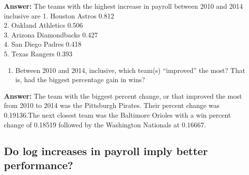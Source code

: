 \documentclass[
]{article}
\newenvironment{Shaded}{\begin{snugshade}}{\end{snugshade}}
\newcommand{\AttributeTok}[1]{\textcolor[rgb]{0.77,0.63,0.00}{#1}}
\newcommand{\CommentTok}[1]{\textcolor[rgb]{0.56,0.35,0.01}{\textit{#1}}}
\newcommand{\ConstantTok}[1]{\textcolor[rgb]{0.00,0.00,0.00}{#1}}
\newcommand{\DecValTok}[1]{\textcolor[rgb]{0.00,0.00,0.81}{#1}}
\newcommand{\FunctionTok}[1]{\textcolor[rgb]{0.00,0.00,0.00}{#1}}
\newcommand{\NormalTok}[1]{#1}
\newcommand{\OtherTok}[1]{\textcolor[rgb]{0.56,0.35,0.01}{#1}}
\newcommand{\SpecialCharTok}[1]{\textcolor[rgb]{0.00,0.00,0.00}{#1}}
\newcommand{\StringTok}[1]{\textcolor[rgb]{0.31,0.60,0.02}{#1}}
\providecommand{\tightlist}{%
  \setlength{\itemsep}{0pt}\setlength{\parskip}{0pt}}
\begin{document}
\textbf{Answer:} The teams with the highest increase in payroll between
2010 and 2014 inclusive are 1. Houston Astros 0.812\\
2. Oakland Athletics 0.506\\
3. Arizona Diamondbacks 0.427\\
4. San Diego Padres 0.418\\
5. Texas Rangers 0.393

\begin{enumerate}
\def\labelenumi{\roman{enumi}.}
\setcounter{enumi}{1}
\tightlist
\item
  Between 2010 and 2014, inclusive, which team(s) ``improved'' the most?
  That is, had the biggest percentage gain in wins?
\end{enumerate}

\begin{Shaded}
\end{Shaded}

\textbf{Answer:} The team with the biggest percent change, or that
improved the most from 2010 to 2014 was the Pittsburgh Pirates. Their
percent change was 0.19136.The next closest team was the Baltimore
Orioles with a win percent change of 0.18519 followed by the Washington
Nationals at 0.16667.

\hypertarget{do-log-increases-in-payroll-imply-better-performance}{%
\subsection{Do log increases in payroll imply better
performance?}\label{do-log-increases-in-payroll-imply-better-performance}}
\end{document}
